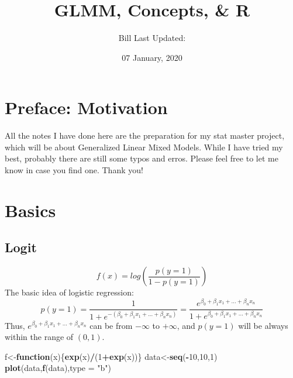 \documentclass[]{book}
\title{GLMM, Concepts, \& R}
\author{Bill Last Updated:}
\date{07 January, 2020}
\newenvironment{Shaded}{\begin{snugshade}}{\end{snugshade}}
\newcommand{\ControlFlowTok}[1]{\textcolor[rgb]{0.13,0.29,0.53}{\textbf{#1}}}
\newcommand{\DataTypeTok}[1]{\textcolor[rgb]{0.13,0.29,0.53}{#1}}
\newcommand{\DecValTok}[1]{\textcolor[rgb]{0.00,0.00,0.81}{#1}}
\newcommand{\KeywordTok}[1]{\textcolor[rgb]{0.13,0.29,0.53}{\textbf{#1}}}
\newcommand{\NormalTok}[1]{#1}
\newcommand{\OperatorTok}[1]{\textcolor[rgb]{0.81,0.36,0.00}{\textbf{#1}}}
\newcommand{\StringTok}[1]{\textcolor[rgb]{0.31,0.60,0.02}{#1}}
\begin{document}
\maketitle

{
\setcounter{tocdepth}{1}
\tableofcontents
}
\hypertarget{my-section}{%
\chapter*{Preface: Motivation}\label{my-section}}

All the notes I have done here are the preparation for my stat master project, which will be about Generalized Linear Mixed Models. While I have tried my best, probably there are still some typos and erros. Please feel free to let me know in case you find one. Thank you!

\hypertarget{basics}{%
\chapter{Basics}\label{basics}}

\hypertarget{logit}{%
\section{Logit}\label{logit}}

\[f(x)=log(\frac{p(y=1)}{1-p(y=1)})\]
The basic idea of logistic regression:
\[p(y=1)=\frac{1}{1+e^{-(\beta_0+\beta_1x_1+...+\beta_nx_n)}}=\frac{e^{\beta_0+\beta_1x_1+...+\beta_nx_n}}{1+e^{\beta_0+\beta_1x_1+...+\beta_nx_n}}\]
Thus, \(e^{\beta_0+\beta_1x_1+...+\beta_nx_n}\) can be from \(-\infty\) to \(+\infty\), and \(p(y=1)\) will be always within the range of \((0,1)\).

\begin{Shaded}
\begin{Highlighting}[]
\NormalTok{f<-}\ControlFlowTok{function}\NormalTok{(x)\{}\KeywordTok{exp}\NormalTok{(x)}\OperatorTok{/}\NormalTok{(}\DecValTok{1}\OperatorTok{+}\KeywordTok{exp}\NormalTok{(x))\}}
\NormalTok{data<-}\KeywordTok{seq}\NormalTok{(}\OperatorTok{-}\DecValTok{10}\NormalTok{,}\DecValTok{10}\NormalTok{,}\DecValTok{1}\NormalTok{)}
\KeywordTok{plot}\NormalTok{(data,}\KeywordTok{f}\NormalTok{(data),}\DataTypeTok{type =} \StringTok{"b"}\NormalTok{)}
\end{Highlighting}
\end{Shaded}
\end{document}

